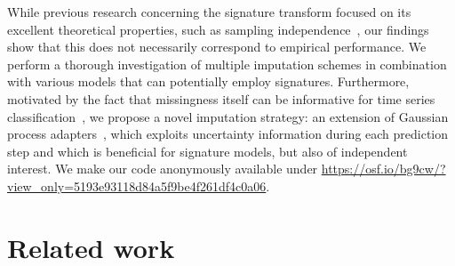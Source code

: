 \documentclass{article}
\begin{document}
While previous research concerning the signature transform
focused on its excellent theoretical properties, such as sampling
independence~\citep[Proposition A.7]{kidger2019deep}, our findings show
that this does not
necessarily correspond to empirical performance.
%
We perform a thorough investigation of multiple imputation schemes in combination with various models that can potentially employ signatures.
Furthermore, motivated by the fact that missingness itself can be
informative for time series classification~\citep{rubin1976inference}, we propose a novel imputation strategy: an extension of Gaussian process adapters~\citep{li2016scalable, futoma2017mgp}, which exploits uncertainty information during each prediction step and which is beneficial for signature models, but also of independent interest.
%
%
%
We make our code anonymously available under \url{https://osf.io/bg9cw/?view_only=5193e93118d84a5f9be4f261df4c0a06}.

\section{Related work} %
\end{document}

